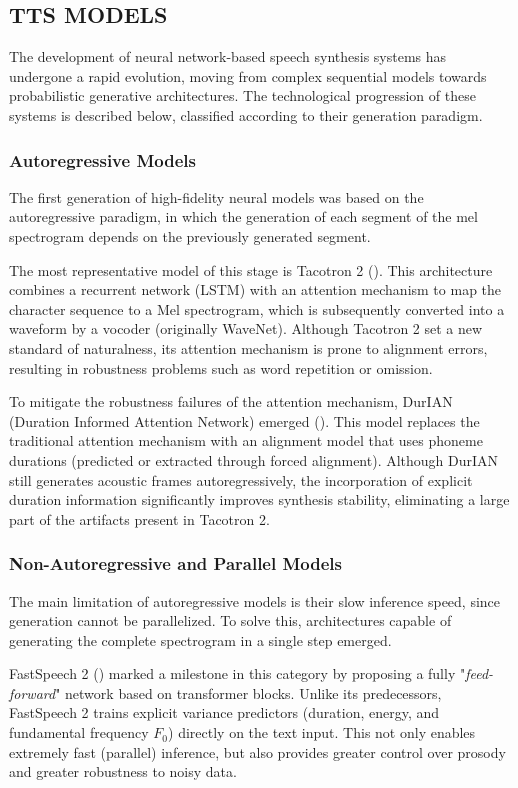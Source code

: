\subsection{TTS MODELS}
\label{sec:estado_arte_tts}
The development of neural network-based speech synthesis systems has undergone a rapid evolution, moving from complex sequential models towards probabilistic generative architectures. The technological progression of these systems is described below, classified according to their generation paradigm.

\subsubsection{Autoregressive Models}
The first generation of high-fidelity neural models was based on the autoregressive paradigm, in which the generation of each segment of the mel spectrogram depends on the previously generated segment.

The most representative model of this stage is Tacotron 2 (\cite{shen2018natural}). This architecture combines a recurrent network (LSTM) with an attention mechanism to map the character sequence to a Mel spectrogram, which is subsequently converted into a waveform by a vocoder (originally WaveNet). Although Tacotron 2 set a new standard of naturalness, its attention mechanism is prone to alignment errors, resulting in robustness problems such as word repetition or omission.

To mitigate the robustness failures of the attention mechanism, DurIAN (Duration Informed Attention Network) emerged (\cite{yu2019durian}). This model replaces the traditional attention mechanism with an alignment model that uses phoneme durations (predicted or extracted through forced alignment). Although DurIAN still generates acoustic frames autoregressively, the incorporation of explicit duration information significantly improves synthesis stability, eliminating a large part of the artifacts present in Tacotron 2.

\subsubsection{Non-Autoregressive and Parallel Models}
The main limitation of autoregressive models is their slow inference speed, since generation cannot be parallelized. To solve this, architectures capable of generating the complete spectrogram in a single step emerged.

FastSpeech 2 (\cite{ren2020fastspeech}) marked a milestone in this category by proposing a fully "\textit{feed-forward}" network based on transformer blocks. Unlike its predecessors, FastSpeech 2 trains explicit variance predictors (duration, energy, and fundamental frequency $F_0$) directly on the text input. This not only enables extremely fast (parallel) inference, but also provides greater control over prosody and greater robustness to noisy data.

